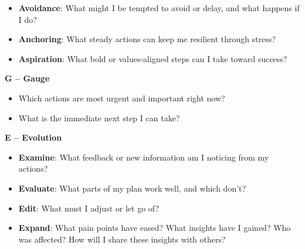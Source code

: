 \documentclass[11pt]{article}
\begin{document}
\begin{itemize}[noitemsep]
  \item \textbf{Avoidance}: What might I be tempted to avoid or delay, and what happens if I do?
  \item \textbf{Anchoring}: What steady actions can keep me resilient through stress?
  \item \textbf{Aspiration}: What bold or values-aligned steps can I take toward success?
\end{itemize}
\begin{answerbox}
\vspace{4em}
\end{answerbox}

\textbf{G – Gauge}

\begin{itemize}[noitemsep]
  \item Which actions are most urgent and important right now?
  \item What is the immediate next step I can take?
\end{itemize}
\begin{answerbox}
\vspace{3em}
\end{answerbox}

\textbf{E – Evolution}

\begin{itemize}[noitemsep]
  \item \textbf{Examine}: What feedback or new information am I noticing from my actions?
  \item \textbf{Evaluate}: What parts of my plan work well, and which don’t?
  \item \textbf{Edit}: What must I adjust or let go of?
  \item \textbf{Expand}: What pain points have eased? What insights have I gained? Who was affected? How will I share these insights with others?
\end{itemize}
\begin{answerbox}
\vspace{5em}
\end{answerbox}
\end{document}
